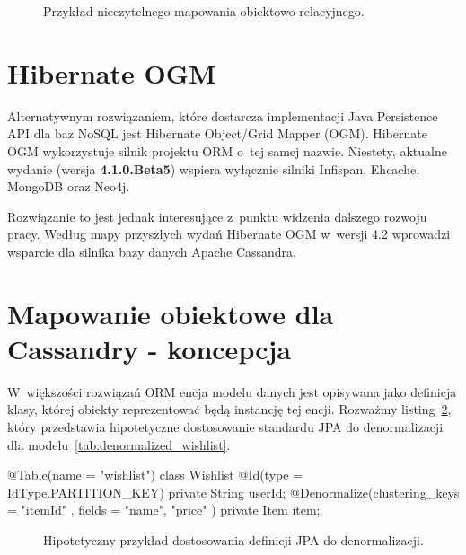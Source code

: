 \begin{figure}[ht!]
	\centering
	\theverbbox
	\caption{Przykład nieczytelnego mapowania obiektowo-relacyjnego.}
	\label{vrb:awful_orm}
\end{figure}

\section{Hibernate OGM}
\label{sec:hibernate_ogm}

Alternatywnym rozwiązaniem, które dostarcza implementacji Java Persistence API dla baz NoSQL jest Hibernate Object/Grid Mapper (OGM). Hibernate OGM wykorzystuje silnik projektu ORM o~tej samej nazwie. Niestety, aktualne wydanie (wersja \textbf{4.1.0.Beta5}) wspiera wyłącznie silniki Infispan, Ehcache, MongoDB oraz Neo4j. 

Rozwiązanie to jest jednak interesujące z~punktu widzenia dalszego rozwoju pracy. Według mapy przyszłych wydań Hibernate OGM w~wersji 4.2 wprowadzi wsparcie dla silnika bazy danych Apache Cassandra.~\cite{hibernate_ogm_roadmap} 

\section{Mapowanie obiektowe dla Cassandry - koncepcja}
\label{sec:om_for_cassandra_concept}

W~większości rozwiązań ORM encja modelu danych jest opisywana jako definicja klasy, której obiekty reprezentować będą instancję tej encji. Rozważmy listing~\ref{vrb:jpa_denormalization_theory}, który przedstawia hipotetyczne dostosowanie standardu JPA do denormalizacji dla modelu~\ref{tab:denormalized_wishlist}.

\begin{verbbox}
	@Table(name = "wishlist")
	class Wishlist {
	    @Id(type = IdType.PARTITION_KEY) 
	    private String userId;
	    @Denormalize(clustering_keys = { "itemId" }, 
	                 fields = { "name", "price" })
	    private Item item;
	}
\end{verbbox}

\begin{figure}[ht!]
	\centering
	\theverbbox
	\caption{Hipotetyczny przykład dostosowania definicji JPA do denormalizacji.}
	\label{vrb:jpa_denormalization_theory}
\end{figure}


